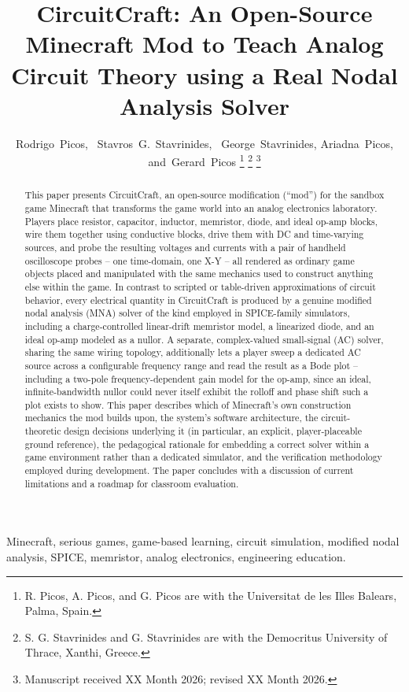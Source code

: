 \documentclass[journal]{IEEEtran}
\title{CircuitCraft: An Open-Source Minecraft Mod to Teach Analog Circuit Theory using a Real Nodal Analysis Solver}
\author{Rodrigo~Picos,~\IEEEmembership{Senior~Member,~IEEE,}
        Stavros~G.~Stavrinides,~\IEEEmembership{Senior~Member,~IEEE,}
        George~Stavrinides, Ariadna~Picos, and~Gerard~Picos%
\thanks{R. Picos, A. Picos, and G. Picos are with the Universitat de les Illes Balears, Palma, Spain.}%
\thanks{S. G. Stavrinides and G. Stavrinides are with the Democritus University of Thrace, Xanthi, Greece.}%
\thanks{Manuscript received XX Month 2026; revised XX Month 2026.}}
\begin{document}
\maketitle

\begin{abstract}
This paper presents CircuitCraft, an open-source modification (``mod'') for the sandbox
game Minecraft that transforms the game world into an analog electronics laboratory. Players
place resistor, capacitor, inductor, memristor, diode, and ideal op-amp blocks, wire them
together using conductive blocks, drive them with DC and time-varying sources, and probe the
resulting voltages and currents with a pair of handheld oscilloscope probes -- one
time-domain, one X-Y -- all rendered as ordinary game objects placed and manipulated with the
same mechanics used to construct anything else within the game. In contrast to scripted or
table-driven approximations of circuit behavior, every electrical quantity in CircuitCraft
is produced by a genuine modified nodal analysis (MNA) solver of the kind
employed in SPICE-family simulators, including a charge-controlled linear-drift memristor
model, a linearized diode, and an ideal op-amp modeled as a nullor. A separate, complex-valued
small-signal (AC) solver, sharing the same wiring topology, additionally lets a player sweep a
dedicated AC source across a configurable frequency range and read the result as a Bode plot --
including a two-pole frequency-dependent gain model for the op-amp, since an ideal, infinite-bandwidth
nullor could never itself exhibit the rolloff and phase shift such a plot exists to show. This
paper describes
which of Minecraft's own construction
mechanics the mod builds upon, the system's software architecture, the circuit-theoretic
design decisions underlying it (in particular, an explicit, player-placeable ground
reference), the pedagogical rationale for embedding a correct solver within a game
environment rather than a dedicated simulator, and the verification methodology employed
during development. The paper concludes with a discussion of current limitations and a
roadmap for classroom evaluation.
\end{abstract}

\begin{IEEEkeywords}
Minecraft, serious games, game-based learning, circuit simulation, modified nodal analysis,
SPICE, memristor, analog electronics, engineering education.
\end{IEEEkeywords}

\IEEEpeerreviewmaketitle



















\end{document}
